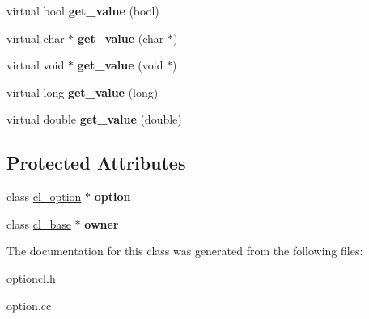 \begin{DoxyCompactItemize}
\item 
\hypertarget{classcl__optref_a0794160f2fa675366c6ee88f9136875f}{
virtual bool {\bfseries get\_\-value} (bool)}
\label{classcl__optref_a0794160f2fa675366c6ee88f9136875f}

\item 
\hypertarget{classcl__optref_a0ad86a93d20f82905b63f2ec81f50961}{
virtual char $\ast$ {\bfseries get\_\-value} (char $\ast$)}
\label{classcl__optref_a0ad86a93d20f82905b63f2ec81f50961}

\item 
\hypertarget{classcl__optref_a1ff9c3b5605ef99451515e495b4b785a}{
virtual void $\ast$ {\bfseries get\_\-value} (void $\ast$)}
\label{classcl__optref_a1ff9c3b5605ef99451515e495b4b785a}

\item 
\hypertarget{classcl__optref_a1e9567c9088f7fa9d98e5d3484ce77b1}{
virtual long {\bfseries get\_\-value} (long)}
\label{classcl__optref_a1e9567c9088f7fa9d98e5d3484ce77b1}

\item 
\hypertarget{classcl__optref_af11f6cc27f00273fedf01122843deb80}{
virtual double {\bfseries get\_\-value} (double)}
\label{classcl__optref_af11f6cc27f00273fedf01122843deb80}

\end{DoxyCompactItemize}
\subsection*{Protected Attributes}
\begin{DoxyCompactItemize}
\item 
\hypertarget{classcl__optref_a9234d980ec032f48dd137ed2676eb815}{
class \hyperlink{classcl__option}{cl\_\-option} $\ast$ {\bfseries option}}
\label{classcl__optref_a9234d980ec032f48dd137ed2676eb815}

\item 
\hypertarget{classcl__optref_a483428efce1211af9ba5e51296257820}{
class \hyperlink{classcl__base}{cl\_\-base} $\ast$ {\bfseries owner}}
\label{classcl__optref_a483428efce1211af9ba5e51296257820}

\end{DoxyCompactItemize}


The documentation for this class was generated from the following files:\begin{DoxyCompactItemize}
\item 
optioncl.h\item 
option.cc\end{DoxyCompactItemize}
